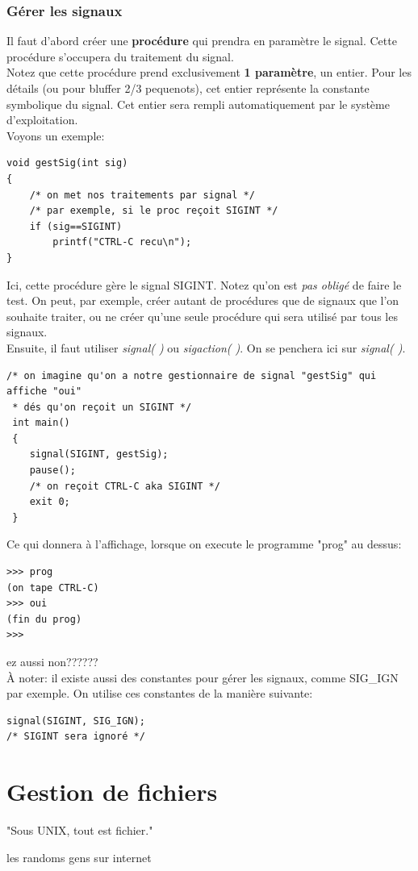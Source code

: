 \documentclass{report}
\begin{document}
\subsection{Gérer les signaux}
Il faut d'abord créer une \textbf{procédure} qui prendra en paramètre le signal. Cette procédure s'occupera du traitement du signal.\\
Notez que cette procédure prend exclusivement \textbf{1 paramètre}, un entier. Pour les détails (ou pour bluffer 2/3 pequenots), cet entier représente la constante symbolique du signal. Cet entier sera rempli automatiquement par le système d'exploitation.\\
Voyons un exemple:
\begin{lstlisting}
void gestSig(int sig)
{	
	/* on met nos traitements par signal */
	/* par exemple, si le proc reçoit SIGINT */
	if (sig==SIGINT)
		printf("CTRL-C recu\n");
}
\end{lstlisting}
Ici, cette procédure gère le signal SIGINT. Notez qu'on est \emph{pas obligé} de faire le test. On peut, par exemple, créer autant de procédures que de signaux que l'on souhaite traiter, ou ne créer qu'une seule procédure qui sera utilisé par tous les signaux.\\
Ensuite, il faut utiliser \emph{signal( )} ou \emph{sigaction( )}. On se penchera ici sur \emph{signal( )}.
\begin{lstlisting}
/* on imagine qu'on a notre gestionnaire de signal "gestSig" qui affiche "oui"
 * dés qu'on reçoit un SIGINT */
 int main()
 {
 	signal(SIGINT, gestSig);
	pause();
	/* on reçoit CTRL-C aka SIGINT */
	exit 0;
 }
\end{lstlisting}
Ce qui donnera à l'affichage, lorsque on execute le programme "prog" au dessus:
\begin{verbatim}
>>> prog
(on tape CTRL-C)
>>> oui
(fin du prog)
>>>
\end{verbatim}
ez aussi non??????\\
À noter: il existe aussi des constantes pour gérer les signaux, comme SIG\_IGN par exemple. On utilise ces constantes de la manière suivante:
\begin{lstlisting}
signal(SIGINT, SIG_IGN);
/* SIGINT sera ignoré */
\end{lstlisting}



\chapter{Gestion de fichiers}
\epigraph{"Sous UNIX, tout est fichier."}{les randoms gens sur internet}
\end{document}
